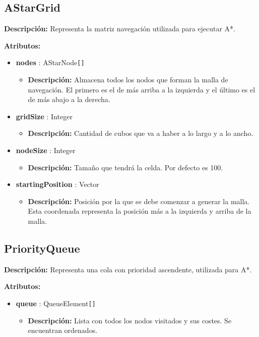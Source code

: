 \subsection{AStarGrid}
\textbf{Descripción: }Representa la matriz navegación utilizada para ejecutar A*.

\bigskip

\textbf{Atributos: }
\begin{itemize}
    \item \textbf{nodes} : AStarNode\verb|[]|
    \begin{itemize}
        \item \textbf{Descripción: }Almacena todos los nodos que forman la malla de navegación. El primero es el de más arriba a la izquierda y el último es el de más abajo a la derecha.
    \end{itemize}
    \item \textbf{gridSize} : Integer
    \begin{itemize}
        \item \textbf{Descripción: }Cantidad de cubos que va a haber a lo largo y a lo ancho.
    \end{itemize}
    \item \textbf{nodeSize} : Integer
    \begin{itemize}
        \item \textbf{Descripción: }Tamaño que tendrá la celda. Por defecto es 100.
    \end{itemize}
    \item \textbf{startingPosition} : Vector
    \begin{itemize}
        \item \textbf{Descripción: }Posición por la que se debe comenzar a generar la malla. Esta coordenada representa la posición más a la izquierda y arriba de la malla.
    \end{itemize}
\end{itemize}

\subsection{PriorityQueue}
\textbf{Descripción: }Representa una cola con prioridad ascendente, utilizada para A*.

\bigskip

\textbf{Atributos: }
\begin{itemize}
    \item \textbf{queue} : QueueElement\verb|[]|
    \begin{itemize}
        \item \textbf{Descripción: }Lista con todos los nodos visitados y sus costes. Se encuentran ordenados.
    \end{itemize}
\end{itemize}


